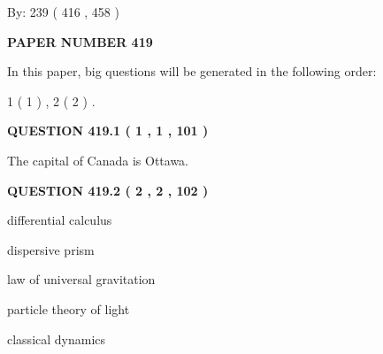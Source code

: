 \documentclass[12pt]{article}
\begin{document}
   
\hspace{1.0in} By: 
 239 ( 416 ,  458 )
   
   
   
   
\newpage 
\setcounter{page}{ 
   419001 } 
   
   
   
   
 {\textbf{ \Large{ PAPER NUMBER  419  }}}
   
   
\vspace{0.2in}
   
   
   
   
   
\vspace{0.2in}
   
In this paper, big questions will be generated in the following order: 
   
   
   1 ( 1 )
 ,
   2 ( 2 )
 .
  
\vspace{0.2in}
  
{\textbf{\Large{QUESTION
419.1 
 ( 1 , 1 , 101 )
}}}
  
  
 
 
\noindent{}
 
 
The capital of Canada is Ottawa.
 
 
 
 
  
\vspace{0.2in}
  
{\textbf{\Large{QUESTION
419.2 
 ( 2 , 2 , 102 )
}}}
  
  
 
 
\noindent{}
 
 
differential calculus
 
 
dispersive prism
 
 
law of universal gravitation
 
 
particle theory of light
 
 
classical dynamics
 
 
 
 
   
\end{document}
